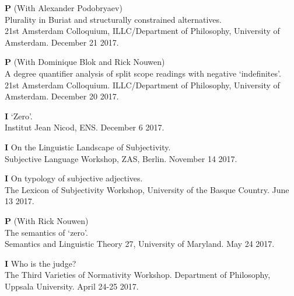\documentclass[12pt,letterpaper]{article}
\begin{document}
{\begin{hangparas}{.25in}{1}
\textbf{P}  \hspace{2mm} (With Alexander Podobryaev) \\
Plurality in Buriat and structurally constrained alternatives. \\
21st Amsterdam Colloquium, ILLC/Department of Philosophy, University of Amsterdam. December 21 2017.

\vspace{1mm}

\textbf{P}  \hspace{2mm} (With Dominique Blok and Rick Nouwen) \\
A degree quantifier analysis of split scope readings with negative `indefinites'. \\
21st Amsterdam Colloquium. ILLC/Department of Philosophy, University of Amsterdam. December 20 2017.

\vspace{1mm}

\textbf{I} \hspace{2mm} `Zero'. \\
Institut Jean Nicod, ENS. December 6 2017.

\vspace{1mm}

\textbf{I} \hspace{2mm} On the Linguistic Landscape of Subjectivity. \\
Subjective Language Workshop, ZAS, Berlin. November 14 2017.

\vspace{1mm}

\textbf{I} \hspace{2mm}  On typology of subjective adjectives. \\
The Lexicon of Subjectivity Workshop, University of the Basque Country. June 13 2017.

\vspace{1mm}

\textbf{P}  \hspace{2mm} (With Rick Nouwen) \\
The semantics of `zero'.\\
Semantics and Linguistic Theory 27, University of Maryland. May 24 2017.

\vspace{1mm}

\textbf{I} \hspace{2mm} Who is the judge? \\The Third Varieties of Normativity Workshop. Department of Philosophy, Uppsala University. April 24-25 2017.


\end{hangparas}}
\end{document}
